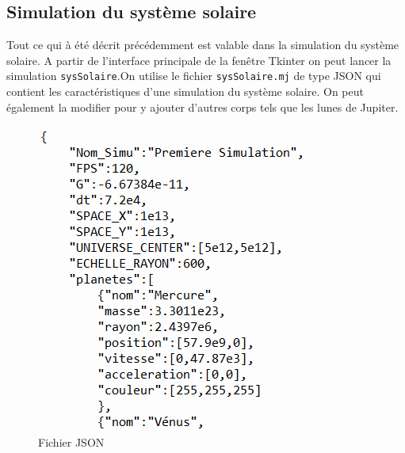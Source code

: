 \documentclass[a4paper, 12pt]{article}
\begin{document}
\subsection{Simulation du système solaire}
Tout ce qui à été décrit précédemment est valable dans la simulation du système solaire.
A partir de l'interface principale de la fenêtre Tkinter on peut lancer la simulation \texttt{sysSolaire}.On utilise le fichier \texttt{sysSolaire.mj} de type JSON qui contient les caractéristiques d'une simulation du système solaire. On peut également la modifier pour y ajouter d'autres corps tels que les lunes de Jupiter.

	\begin{figure}[H]
		\centering
		\includegraphics[width=0.27\linewidth]{img/json.png}
		\caption{\label{fig: json} Fichier JSON}  
	\end{figure}
	
\end{document}
